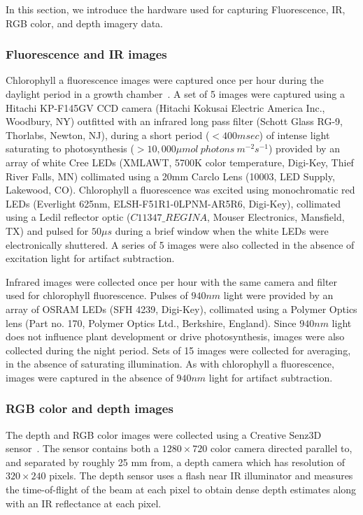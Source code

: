 
In this section, we introduce the hardware used for capturing Fluorescence, IR, RGB color, and depth imagery data.

\subsubsection{Fluorescence and IR images}
Chlorophyll a fluorescence images were captured once per hour during the daylight period in a growth chamber~\cite{cruz2015depi}. A set of 5 images were captured using a Hitachi KP-F145GV CCD camera (Hitachi Kokusai Electric America Inc., Woodbury, NY) outfitted with an infrared long pass filter (Schott Glass RG-9, Thorlabs, Newton, NJ), during a short period ($<400 msec$) of intense light saturating to photosynthesis ($>10,000 \mu mol~photons~m^{-2} s^{-1}$) provided by an array of white Cree LEDs (XMLAWT, 5700K color temperature, Digi-Key, Thief River Falls, MN) collimated using a 20mm Carclo Lens (10003, LED Supply, Lakewood, CO).
%
Chlorophyll a fluorescence was excited using monochromatic red LEDs (Everlight 625nm, ELSH-F51R1-0LPNM-AR5R6, Digi-Key), collimated using a Ledil reflector optic ($C11347\_REGINA$, Mouser Electronics, Mansfield, TX) and pulsed for $50 \mu s$ during a brief window when the white LEDs were electronically shuttered.  A series of 5 images were also collected in the absence of excitation light for artifact subtraction.

Infrared images were collected once per hour with the same camera and filter used for chlorophyll fluorescence.  Pulses of $940 nm$ light were provided by an array of OSRAM LEDs (SFH 4239, Digi-Key), collimated using a Polymer Optics lens (Part no. 170, Polymer Optics Ltd., Berkshire, England).  Since $940 nm$ light does not influence plant development or drive photosynthesis, images were also collected during the night period.  Sets of 15 images were collected for averaging, in the absence of saturating illumination.   As with chlorophyll a fluorescence, images were captured in the absence of $940 nm$ light for artifact subtraction.

\subsubsection{RGB color and depth images} %

The depth and RGB color images were collected using a Creative Senz3D sensor~\cite{nguyen2015vietnamese}. The sensor contains both a $1280 \times 720$ color camera directed parallel to, and separated by roughly 25 mm from, a depth camera which has resolution of $320\times240$ pixels. The depth sensor uses a flash near IR illuminator and measures the time-of-flight of the beam at each pixel to obtain dense depth estimates along with an IR reflectance at each pixel.

